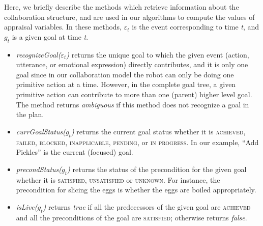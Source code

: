 \documentclass{article}
\begin{document}

Here, we briefly describe the methods which retrieve information about the
collaboration structure, and are used in our algorithms to compute the values of
appraisal variables. In these methods, $\varepsilon_t$ is the event
corresponding to time \textit{t}, and $g_t$ is a given goal at time \textit{t}.

\begin{itemize}[leftmargin=2pt]
  \setlength\itemsep{0.2mm}
  \item \textit{recognizeGoal($\varepsilon_t$)} returns the unique goal to which
  the given event (action, utterance, or emotional expression) directly
  contributes, and it is only one goal since in our collaboration model the
  robot can only be doing one primitive action at a time. However, in the
  complete goal tree, a given primitive action can contribute to more than one
  (parent) higher level goal. The method returns \textit{ambiguous} if this
  method does not recognize a goal in the plan.
  
  
  \item \textit{currGoalStatus($g_t$)} returns the current goal status whether
  it is \textsc{achieved, failed, blocked, inapplicable, pending,} or \textsc{in
  progress}. In our example, ``Add Pickles'' is the current
  (focused) goal.
  
  \item \textit{precondStatus($g_t$)} returns the status of the precondition for
  the given goal whether it is \textsc{satisfied, unsatisfied} or
  \textsc{unknown}. For instance, the precondition for slicing the eggs is
  whether the eggs are boiled appropriately.
  
  \item \textit{isLive($g_t$)} returns \textit{true} if all the predecessors of
  the given goal are \textsc{achieved} and all the preconditions of the goal are
  \textsc{satisfied}; otherwise returns \textit{false}.
  

\end{itemize}
\end{document}
